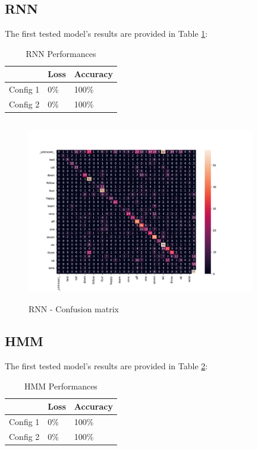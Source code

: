 \subsection{\textbf{RNN}}
The first tested model's results are provided in Table \ref{table:rnn_performances}:\\
\begin{table}[h!]
\centering
\begin{tabular}{ p{1.5cm}|p{1.5cm}|p{1.5cm}| }
 \hline
   & Loss & Accuracy\\
\hline
Config 1 & 0\% & 100\%  \\
Config 2 & 0\% & 100\% \\
\hline
\end{tabular}
\caption{RNN Performances}
\label{table:rnn_performances}
\end{table}

\begin{figure}[h]
			\centering
	    	\includegraphics[width=10cm, height=8cm]{conf_matrix_cnn_dii_cm}
	    	\caption{RNN - Confusion matrix}
	    	\label{fig:conf_matrix_cnn}
\end{figure} 



\subsection{\textbf{HMM}}
The first tested model's results are provided in Table \ref{table:hmm_performances}:\\
\begin{table}[h!]
\centering
\begin{tabular}{ p{1.5cm}|p{1.5cm}|p{1.5cm}| }
 \hline
   & Loss & Accuracy\\
\hline
Config 1 & 0\% & 100\%  \\
Config 2 & 0\% & 100\% \\
\hline
\end{tabular}
\caption{HMM Performances}
\label{table:hmm_performances}
\end{table}

